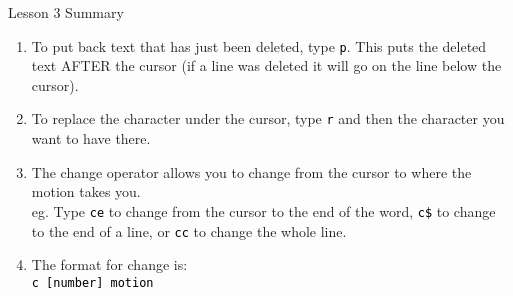 \documentclass[handout, 10pt]{beamer}
\newcommand{\code}[2][black]{\textcolor{#1}{\colorbox{codegray}{\texttt{#2}}}}
\begin{document}
\begin{frame}{Lesson 3 Summary}
	\begin{enumerate}
		\item To put back text that has just been deleted, type \code{p}. This
			puts the	deleted text AFTER the cursor (if a line was deleted it
			will go on the line below the cursor).

		\item To replace the character under the cursor, type \code{r} and then
			the character you want to have there.

		\item The change operator allows you to change from the cursor to where
			the	motion takes you. \\
			eg. Type \code{ce} to change from the cursor to the end of the
			word, \code{c\$} to change to the end of a line, or \code{cc} to
			change the whole line.

		\item  The format for change is: \\
			\code{c  [number]  motion}
	\end{enumerate}
\end{frame}
\end{document}
